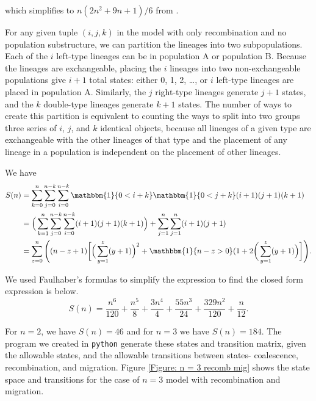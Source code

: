 \documentclass[11pt,oneside]{amsart}
\begin{document}
\noindent which simplifies to $n(2n^2+9n+1)/6$ from \cite{SimonsenChurchill1997}.

For any given tuple $(i, j, k)$ in the model with only recombination and no population substructure, we can partition the lineages into two subpopulations. Each of the $i$ left-type lineages can be in population A or population B. Because the lineages are exchangeable, placing the $i$ lineages into two non-exchangeable populations give $i+1$ total states: either 0, 1, 2, \ldots , or $i$ left-type lineages are placed in population A. Similarly, the $j$ right-type lineages generate $j+1$ states, and the $k$ double-type lineages generate $k+1$ states. The number of ways to create this partition is equivalent to counting the ways to split into two groups three series of $i$, $j$, and $k$ identical objects, because all lineages of a given type are exchangeable with the other lineages of that type and the placement of any lineage in a population is independent on the placement of other lineages. 

We have
\begin{align}
S(n) &= \sum^{n}_{k = 0} \sum^{n-k}_{j = 0} \sum^{n-k}_{i = 0}  \mathbbm{1}\{0 < i + k\}\mathbbm{1}\{0 < j + k\}(i+1)(j+1)(k+1) \\
&= \Big( \sum^{n}_{k = 1} \sum^{n-k}_{j = 0} \sum^{n-k}_{i = 0} (i+1)(j+1)(k+1) \Big) + \sum^{n}_{j = 1} \sum^{n}_{j = 1}(i+1)(j+1)\\
&= \sum^{n}_{z = 0} \Bigg( (n-z+1)\bigg[\Big(\sum^{z}_{y = 1} (y+1)\Big)^2 + \mathbbm{1}\{n-z > 0\}(1+2\bigg(\sum^z_{y = 1}(y+1)\Big) \bigg] \Bigg).
\label{Eqn: combinatorial count}
\end{align}

We used Faulhaber's formulas to simplify the expression to find the closed form expression is below.
\begin{equation}
S(n) = \frac{n^6}{120}+\frac{n^5}{8}+\frac{3n^4}{4}+\frac{55n^3}{24}+\frac{329n^2}{120}+\frac{n}{12}.
\label{Eqn: combinatorial count Fauhaber formula}
\end{equation}

For $n = 2$, we have $S(n) = 46$ and for $n=3$ we have $S(n) = 184$. The program we created in \texttt{python} generate these states and transition matrix, given the allowable states, and the allowable transitions between states- coalescence, recombination, and migration. Figure \ref{Figure: n = 3 recomb mig} shows the state space and transitions for the case of $n = 3$ model with recombination and migration.
\end{document}
